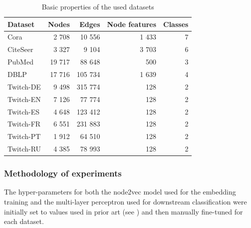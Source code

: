 \begin{table}
  \begin{center}
    \begin{minipage}{280pt} %
      \caption{Basic properties of the used datasets}
      \label{tab:dataset-sizes}
      \begin{tabular}{lrrrr}
        \toprule
        \textbf{Dataset} & \textbf{Nodes} & \textbf{Edges} & \textbf{Node features} & \textbf{Classes} \\
        \midrule
        Cora             & 2 708          & 10 556         & 1 433                  & 7                \\
        CiteSeer         & 3 327          & 9 104          & 3 703                  & 6                \\
        PubMed           & 19 717         & 88 648         & 500                    & 3                \\
        DBLP             & 17 716         & 105 734        & 1 639                  & 4                \\
        Twitch-DE        & 9 498          & 315 774        & 128                    & 2                \\
        Twitch-EN        & 7 126          & 77 774         & 128                    & 2                \\
        Twitch-ES        & 4 648          & 123 412        & 128                    & 2                \\
        Twitch-FR        & 6 551          & 231 883        & 128                    & 2                \\
        Twitch-PT        & 1 912          & 64 510         & 128                    & 2                \\
        Twitch-RU        & 4 385          & 78 993         & 128                    & 2                \\
        \bottomrule
      \end{tabular}
    \end{minipage}
  \end{center}
\end{table}

\subsubsection{Methodology of experiments}

The hyper-parameters for both the node2vec model used for the embedding training and the multi-layer perceptron used for downstream classification were initially set to values used in prior art (see \cite{hu_open_2021,fey_fast_2019}) and then manually fine-tuned for each dataset.

